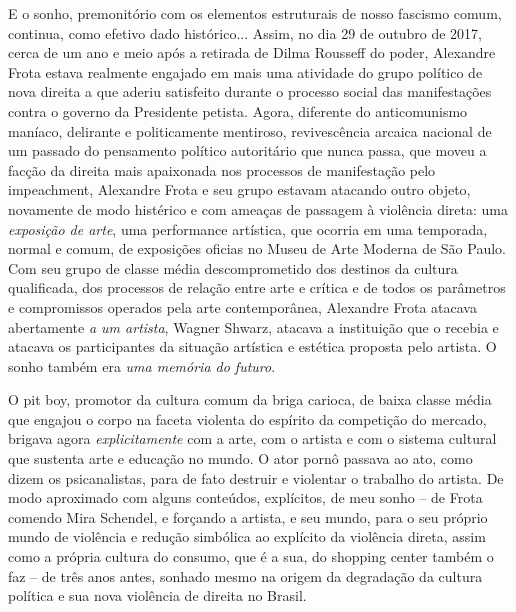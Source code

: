 E o sonho, premonitório com os elementos estruturais de nosso fascismo
comum, continua, como efetivo dado histórico... Assim, no dia 29 de
outubro de 2017, cerca de um ano e meio após a retirada de Dilma
Rousseff do poder, Alexandre Frota estava realmente engajado em mais uma
atividade do grupo político de nova direita a que aderiu satisfeito
durante o processo social das manifestações contra o governo da
Presidente petista. Agora, diferente do anticomunismo maníaco, delirante
e politicamente mentiroso, revivescência arcaica nacional de um passado
do pensamento político autoritário que nunca passa, que moveu a facção
da direita mais apaixonada nos processos de manifestação pelo
impeachment, Alexandre Frota e seu grupo estavam atacando outro objeto,
novamente de modo histérico e com ameaças de passagem à violência
direta: uma \emph{exposição de arte}, uma performance artística, que
ocorria em uma temporada, normal e comum, de exposições oficias no Museu
de Arte Moderna de São Paulo. Com seu grupo de classe média
descomprometido dos destinos da cultura qualificada, dos processos de
relação entre arte e crítica e de todos os parâmetros e compromissos
operados pela arte contemporânea, Alexandre Frota atacava abertamente
\emph{a um artista}, Wagner Shwarz, atacava a instituição que o recebia
e atacava os participantes da situação artística e estética proposta
pelo artista. O sonho também era \emph{uma memória do futuro}.

O pit boy, promotor da cultura comum da briga carioca, de baixa classe
média que engajou o corpo na faceta violenta do espírito da competição
do mercado, brigava agora \emph{explicitamente} com a arte, com o
artista e com o sistema cultural que sustenta arte e educação no mundo.
O ator pornô passava ao ato, como dizem os psicanalistas, para de fato
destruir e violentar o trabalho do artista. De modo aproximado com
alguns conteúdos, explícitos, de meu sonho -- de Frota comendo Mira
Schendel, e forçando a artista, e seu mundo, para o seu próprio mundo de
violência e redução simbólica ao explícito da violência direta, assim
como a própria cultura do consumo, que é a sua, do shopping center
também o faz -- de três anos antes, sonhado mesmo na origem da
degradação da cultura política e sua nova violência de direita no
Brasil.

